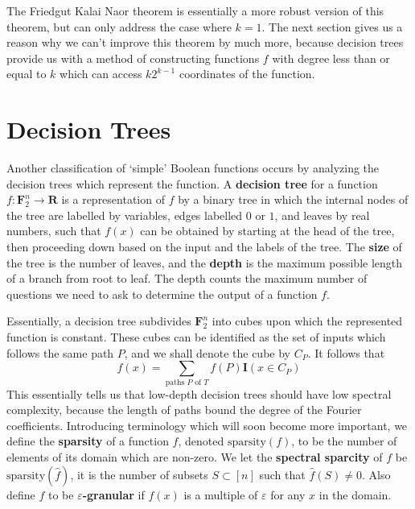 The Friedgut Kalai Naor theorem is essentially a more robust version of this theorem, but can only address the case where $k = 1$. The next section gives us a reason why we can't improve this theorem by much more, because decision trees provide us with a method of constructing functions $f$ with degree less than or equal to $k$ which can access $k2^{k-1}$ coordinates of the function.




\section{Decision Trees}

Another classification of `simple' Boolean functions occurs by analyzing the decision trees which represent the function. A {\bf decision tree} for a function $f: \mathbf{F}_2^n \to \mathbf{R}$ is a representation of $f$ by a binary tree in which the internal nodes of the tree are labelled by variables, edges labelled $0$ or $1$, and leaves by real numbers, such that $f(x)$ can be obtained by starting at the head of the tree, then proceeding down based on the input and the labels of the tree. The {\bf size} of the tree is the number of leaves, and the {\bf depth} is the maximum possible length of a branch from root to leaf. The depth counts the maximum number of questions we need to ask to determine the output of a function $f$.

Essentially, a decision tree subdivides $\mathbf{F}_2^n$ into cubes upon which the represented function is constant. These cubes can be identified as the set of inputs which follows the same path $P$, and we shall denote the cube by $C_P$. It follows that
%
\[ f(x) = \sum_{\text{paths $P$ of $T$}} f(P) \mathbf{I}(x \in C_P) \]
%
This essentially tells us that low-depth decision trees should have low spectral complexity, because the length of paths bound the degree of the Fourier coefficients. Introducing terminology which will soon become more important, we define the {\bf sparsity} of a function $f$, denoted $\text{sparsity}(f)$, to be the number of elements of its domain which are non-zero. We let the {\bf spectral sparcity} of $f$ be $\text{sparsity}(\widehat{f})$, it is the number of subsets $S \subset [n]$ such that $\widehat{f}(S) \neq 0$. Also define $f$ to be {\bf $\varepsilon$-granular} if $f(x)$ is a multiple of $\varepsilon$ for any $x$ in the domain.

